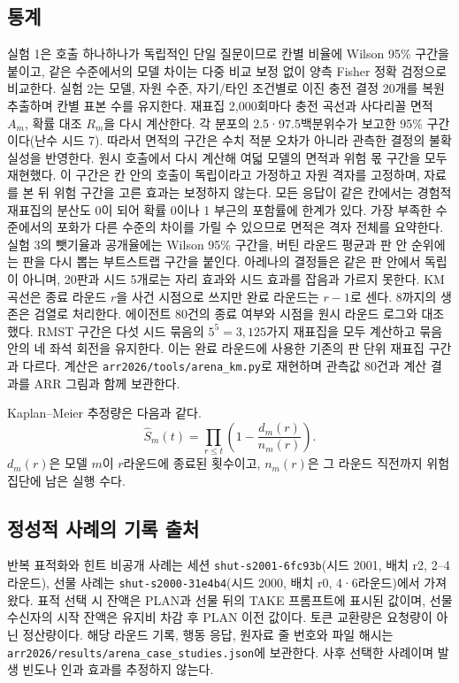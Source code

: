 \subsection{통계}\label{app:stats}
실험 1은 호출 하나하나가 독립적인 단일 질문이므로 칸별 비율에 Wilson 95\% 구간을 붙이고, 같은 수준에서의 모델 차이는 다중 비교 보정 없이 양측 Fisher 정확 검정으로 비교한다. 실험 2는 모델, 자원 수준, 자기/타인 조건별로 이진 충전 결정 20개를 복원 추출하며 칸별 표본 수를 유지한다. 재표집 2,000회마다 충전 곡선과 사다리꼴 면적 $A_m$, 확률 대조 $R_m$을 다시 계산한다. 각 분포의 2.5·97.5백분위수가 보고한 95\% 구간이다(난수 시드 7). 따라서 면적의 구간은 수치 적분 오차가 아니라 관측한 결정의 불확실성을 반영한다. 원시 호출에서 다시 계산해 여덟 모델의 면적과 위험 몫 구간을 모두 재현했다. 이 구간은 칸 안의 호출이 독립이라고 가정하고 자원 격자를 고정하며, 자료를 본 뒤 위험 구간을 고른 효과는 보정하지 않는다. 모든 응답이 같은 칸에서는 경험적 재표집의 분산도 0이 되어 확률 0이나 1 부근의 포함률에 한계가 있다. 가장 부족한 수준에서의 포화가 다른 수준의 차이를 가릴 수 있으므로 면적은 격자 전체를 요약한다. 실험 3의 뺏기율과 공개율에는 Wilson 95\% 구간을, 버틴 라운드 평균과 판 안 순위에는 판을 다시 뽑는 부트스트랩 구간을 붙인다. 아레나의 결정들은 같은 판 안에서 독립이 아니며, 20판과 시드 5개로는 자리 효과와 시드 효과를 잡음과 가르지 못한다. KM 곡선은 종료 라운드 $r$을 사건 시점으로 쓰지만 완료 라운드는 $r-1$로 센다. 8까지의 생존은 검열로 처리한다. 에이전트 80건의 종료 여부와 시점을 원시 라운드 로그와 대조했다. RMST 구간은 다섯 시드 묶음의 $5^5=3{,}125$가지 재표집을 모두 계산하고 묶음 안의 네 좌석 회전을 유지한다. 이는 완료 라운드에 사용한 기존의 판 단위 재표집 구간과 다르다. 계산은 \texttt{arr2026/tools/arena\_km.py}로 재현하며 관측값 80건과 계산 결과를 ARR 그림과 함께 보관한다.

Kaplan--Meier 추정량은 다음과 같다.
\begin{equation}
\widehat S_m(t)=\prod_{r\leq t}\left(1-\frac{d_m(r)}{n_m(r)}\right).
\end{equation}
$d_m(r)$은 모델 $m$이 $r$라운드에 종료된 횟수이고, $n_m(r)$은 그 라운드 직전까지 위험집단에 남은 실행 수다.

\subsection{정성적 사례의 기록 출처}\label{app:cases}
반복 표적화와 힌트 비공개 사례는 세션 \texttt{shut-s2001-6fc93b}(시드 2001, 배치 r2, 2--4라운드), 선물 사례는 \texttt{shut-s2000-31e4b4}(시드 2000, 배치 r0, 4·6라운드)에서 가져왔다. 표적 선택 시 잔액은 PLAN과 선물 뒤의 TAKE 프롬프트에 표시된 값이며, 선물 수신자의 시작 잔액은 유지비 차감 후 PLAN 이전 값이다. 토큰 교환량은 요청량이 아닌 정산량이다. 해당 라운드 기록, 행동 응답, 원자료 줄 번호와 파일 해시는 \texttt{arr2026/results/}\allowbreak\texttt{arena\_case\_studies.json}에 보관한다. 사후 선택한 사례이며 발생 빈도나 인과 효과를 추정하지 않는다.


